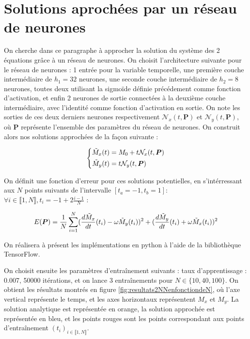 \documentclass[12pt]{report}
\begin{document}
\section{Solutions aprochées par un réseau de neurones}
\label{section:2_NN}

On cherche dans ce paragraphe à approcher la solution du système des 2 équations grâce à un réseau de neurones.
On choisit l'architecture suivante pour le réseau de neurones :
1 entrée pour la variable temporelle, une première couche intermédiaire de $h_1=32$ neurones, une seconde couche intermédiaire de $h_2=8$ neurones, toutes deux utilisant la sigmoïde définie précédement comme fonction d'activation, et enfin 2 neurones de sortie connectées à la deuxième couche intermédiaire, avec l'identité comme fonction d'activation en sortie.
On note les sorties de ces deux derniers neurones respectivement $\mathcal{N}_x(t, \bm{P})$ et $\mathcal{N}_y(t, \bm{P})$, où $\bm{P}$ représente l'ensemble des paramètres du réseau de neurones.
On construit alors nos solutions approchées de la façon suivante :

\begin{equation}
    \left\{
    \begin{aligned}
        \Tilde{M}_x(t) & = M_0+ t\mathcal{N}_x(t, \bm{P}) \\
        \Tilde{M}_y(t) & = t\mathcal{N}_y(t, \bm{P})
    \end{aligned}
    \right.
    \label{eq:solution_2_NN}
\end{equation}


On définit une fonction d'erreur pour ces solutions potentielles, en s'intérressant aux $N$ points suivants de l'intervalle $[t_a=-1, t_b=1]$:
$\forall i \in\llbracket 1,N \rrbracket, t_i = -1 + 2\frac{i-1}{N} $ :

\begin{equation}
    E(\bm{P}) = \frac{1}{N}\sum_{i=1}^{N} (\frac{d\Tilde{M}_x}{dt}(t_i) - \omega \Tilde{M}_y(t_i))^2 + (\frac{d\Tilde{M}_y}{dt}(t_i) + \omega \Tilde{M}_x(t_i))^2
    \label{eq:erreur_2_NN}
\end{equation}

On réalisera à présent les implémentations en python à l'aide de la bibliothèque TensorFlow.

On choisit ensuite les paramètres d'entraînement suivants : taux d'apprentissage : 0.007, 50000 itérations, et on lance 3 entraînements pour $N \in \{10,40,100\}$.
On obtient les résultats montrés en figure \ref{fig:resultats2NNenfonctiondeN}, où l'axe vertical représente le temps, et les axes horizontaux représentent $M_x$ et $M_y$.
La solution analytique est représentée en orange, la solution approchée est représentée en bleu, et les points rouges sont les points correspondant aux points d'entraînement $(t_i)_{i \in \llbracket 1, N \rrbracket}$.
\end{document}
